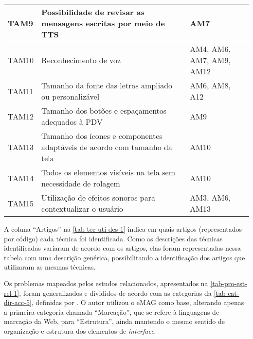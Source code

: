 \begin{table}[htb]
\begin{center}
\begin{tabular}{p{1.2cm}|p{9.2cm}|p{4.1cm}}
            \hline
            TAM9            & Possibilidade de revisar as mensagens escritas por meio de TTS                                     & AM7                                                                  \\
            \hline
            TAM10           & Reconhecimento de voz                                                                              & AM4, AM6, AM7, AM9, AM12                                             \\
            \hline
            TAM11           & Tamanho da fonte das letras ampliado ou personalizável                                             & AM6, AM8, A12                                                        \\
            \hline
            TAM12           & Tamanho dos botões e espaçamentos adequados à PDV                                                  & AM9                                                                  \\
            \hline
            TAM13           & Tamanho dos ícones e componentes adaptáveis de acordo com tamanho da tela                          & AM10                                                                 \\
            \hline
            TAM14           & Todos os elementos visíveis na tela sem necessidade de rolagem                                     & AM10                                                                 \\
            \hline
            TAM15           & Utilização de efeitos sonoros para contextualizar o usuário                                        & AM3, AM6, AM13                                                       \\
        \end{tabular}
    \end{center}
\end{table}

A coluna ``Artigos'' na \autoref{tab-tec-uti-des-1} indica em quais artigos (representados por código) cada técnica foi identificada.
Como as descrições das técnicas identificadas variaram de acordo com os artigos, elas foram representadas nessa tabela
com uma descrição genérica, possibilitando a identificação dos artigos que utilizaram as mesmas técnicas.

\newpage

Os problemas mapeados pelos estudos relacionados, apresentados na \autoref{tab-pro-est-rel-1}, foram generalizados e divididos de acordo com as categorias
da \autoref{tab-cat-dir-acc-5}, definidas por . O autor utilizou o eMAG como base,
alterando apenas a primeira categoria chamada ``Marcação'', que se refere à linguagens de marcação da Web,
para ``Estrutura'', ainda mantendo o mesmo sentido de organização e estrutura dos elementos de \emph{interface}.

